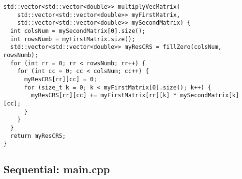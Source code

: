 \documentclass[14pt, russian]{extarticle}
\begin{document}
\begin{lstlisting}
std::vector<std::vector<double>> multiplyVecMatrix(
    std::vector<std::vector<double>> myFirstMatrix,
    std::vector<std::vector<double>> mySecondMatrix) {
  int colsNum = mySecondMatrix[0].size();
  int rowsNumb = myFirstMatrix.size();
  std::vector<std::vector<double>> myResCRS = fillZero(colsNum, rowsNumb);
  for (int rr = 0; rr < rowsNumb; rr++) {
    for (int cc = 0; cc < colsNum; cc++) {
      myResCRS[rr][cc] = 0;
      for (size_t k = 0; k < myFirstMatrix[0].size(); k++) {
        myResCRS[rr][cc] += myFirstMatrix[rr][k] * mySecondMatrix[k][cc];
      }
    }
  }
  return myResCRS;
}

	\end{lstlisting}
	\newpage

	\subsection{Sequential: main.cpp}
\end{document}
